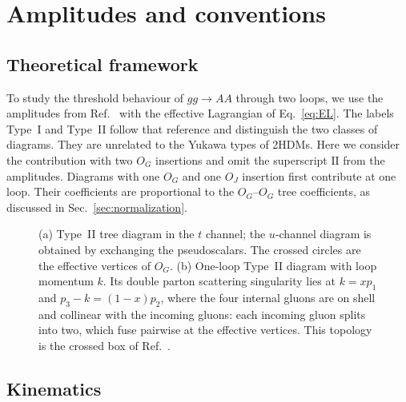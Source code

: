 \section{Amplitudes and conventions}
\label{sec:setup}


\subsection{Theoretical framework}

To study the threshold behaviour of $gg\to AA$ through two loops,
we use the amplitudes from Ref.~\cite{Bhattacharya:2019bmd} with the effective Lagrangian of Eq.~\eqref{eq:EL}. The labels Type~I and Type~II follow
that reference and distinguish the two classes of diagrams.
They are unrelated to the Yukawa types of 2HDMs.
Here we consider the contribution
with two $O_G$ insertions and omit the superscript
$\mathrm{II}$ from the amplitudes. Diagrams with one $O_G$
and one $O_J$ insertion first contribute at one loop.
Their coefficients are proportional to the $O_G$--$O_G$
tree coefficients, as discussed in
Sec.~\ref{sec:normalization}.

\begin{figure}[t]
 \centering
 \diagramsfigure
 \caption{(a) Type~II tree diagram in the $t$ channel; the $u$-channel diagram is obtained by exchanging the pseudoscalars. The crossed circles are the effective vertices of $O_G$. (b) One-loop Type~II diagram with loop momentum $k$. Its double parton scattering singularity lies at $k=xp_1$ and $p_3-k=(1-x)p_2$, where the four internal gluons are on shell and collinear with the incoming gluons: each incoming gluon splits into two, which fuse pairwise at the effective vertices. This topology is the crossed box of Ref.~\cite{GauntStirling2011}.}
 \label{fig:diagrams}
\end{figure}



\subsection{Kinematics}

